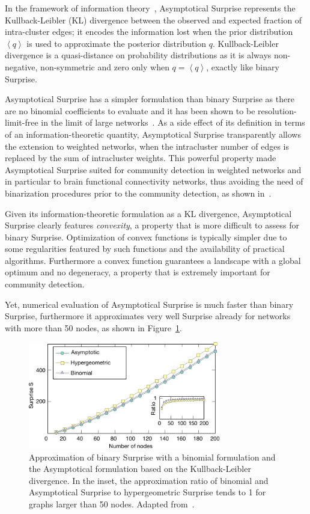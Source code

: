 In the framework of information theory~\cite{cover2006}, Asymptotical Surprise represents the Kullback-Leibler (KL) divergence between the observed and expected fraction of intra-cluster edges; it encodes the information lost when the prior distribution $\left <q \right >$ is used to approximate the posterior distribution $q$.
Kullback-Leibler divergence is a quasi-distance on probability distributions as it is always non-negative, non-symmetric and zero only when $q=\left< q \right>$, exactly like binary Surprise.

Asymptotical Surprise has a simpler formulation than binary Surprise as there are no binomial coefficients to evaluate and it has been shown to be resolution-limit-free in the limit of large networks~\cite{traag2015}.
As a side effect of its definition in terms of an information-theoretic quantity, Asymptotical Surprise transparently allows the extension to weighted networks, when the intracluster number of edges is replaced by the sum of intracluster weights.
This powerful property made Asymptotical Surprise suited for community detection in weighted networks and in particular to brain functional connectivity networks, thus avoiding the need of binarization procedures prior to the community detection, as shown in~\cite{nicolini2017}.

Given its information-theoretic formulation as a KL divergence, Asymptotical Surprise clearly features \emph{convexity}, a property that is more difficult to assess for binary Surprise.
Optimization of convex functions is typically simpler due to some regularities featured by such functions and the availability of practical algorithms.
Furthermore a convex function guarantees a landscape with a global optimum and no degeneracy, a property that is extremely important for community detection.

Yet, numerical evaluation of Asymptotical Surprise is much faster than binary Surprise, furthermore it approximates very well Surprise already for networks with more than 50 nodes, as shown in Figure~\ref{fig:asymptotical_surprise_comparison}.

\begin{figure}[!htb]
\centering
\includegraphics[width=0.75\textwidth]{images/asymptotical_surprise_comparison.pdf}
\caption{Approximation of binary Surprise with a binomial formulation and the Asymptotical formulation based on the Kullback-Leibler divergence.
In the inset, the approximation ratio of binomial and Asymptotical Surprise to hypergeometric Surprise tends to 1 for graphs larger than 50 nodes.
Adapted from~\cite{traag2015}.}
\label{fig:asymptotical_surprise_comparison}
\end{figure}

